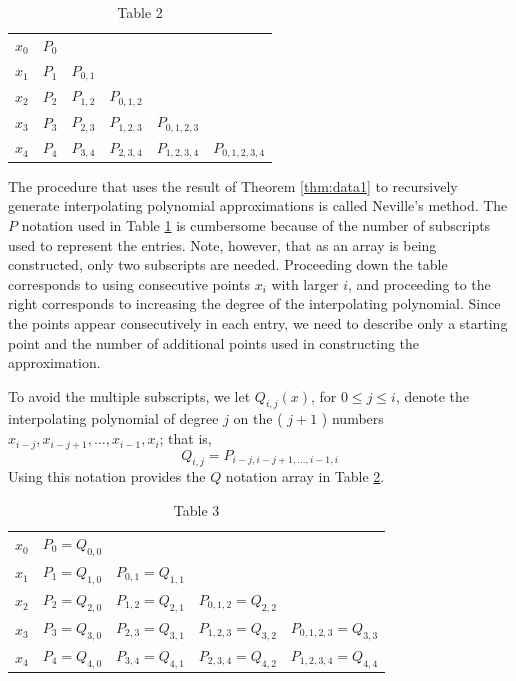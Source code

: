 \begin{table}
\centering
\begin{tabular}{llllll}
\hline
$x_{0}$ & $P_{0}$ &  &  &  &  \\
$x_{1}$ & $P_{1}$ & $P_{0,1}$ &  &  &  \\
$x_{2}$ & $P_{2}$ & $P_{1,2}$ & $P_{0,1,2}$ &  &  \\
$x_{3}$ & $P_{3}$ & $P_{2,3}$ & $P_{1,2,3}$ & $P_{0,1,2,3}$ &  \\
$x_{4}$ & $P_{4}$ & $P_{3,4}$ & $P_{2,3,4}$ & $P_{1,2,3,4}$ & $P_{0,1,2,3,4}$ \\
\hline
\end{tabular}
\caption{\scriptsize Table 2}
\label{tab:dataexplain1}
\end{table}
%
%
%

%

The procedure that uses the result of Theorem \ref{thm:data1} to recursively generate interpolating polynomial approximations is called Neville's method. The $P$ notation used in Table \ref{tab:dataexplain1} is cumbersome because of the number of subscripts used to represent the entries. Note, however, that as an array is being constructed, only two subscripts are needed. Proceeding down the table corresponds to using consecutive points $x_{i}$ with larger $i$, and proceeding to the right corresponds to increasing the degree of the interpolating polynomial. Since the points appear consecutively in each entry, we need to describe only a starting point and the number of additional points used in constructing the approximation.

To avoid the multiple subscripts, we let $Q_{i, j}(x)$, for $0 \leq j \leq i$, denote the interpolating polynomial of degree $j$ on the ( $j+1$ ) numbers $x_{i-j}, x_{i-j+1}, \ldots, x_{i-1}, x_{i}$; that is,
\[Q_{i, j}=P_{i-j, i-j+1, \ldots, i-1, i}\]
Using this notation provides the $Q$ notation array in Table \ref{tab:dataexplain2}.

\begin{table}
\centering
\begin{tabular}{lllll}
\hline
$x_{0}$ & $P_{0}=Q_{0,0}$ &  &  &  \\
$x_{1}$ & $P_{1}=Q_{1,0}$ & $P_{0,1}=Q_{1,1}$ &  &  \\
$x_{2}$ & $P_{2}=Q_{2,0}$ & $P_{1,2}=Q_{2,1}$ & $P_{0,1,2}=Q_{2,2}$ &  \\
$x_{3}$ & $P_{3}=Q_{3,0}$ & $P_{2,3}=Q_{3,1}$ & $P_{1,2,3}=Q_{3,2}$ & $P_{0,1,2,3}=Q_{3,3}$ \\
$x_{4}$ & $P_{4}=Q_{4,0}$ & $P_{3,4}=Q_{4,1}$ & $P_{2,3,4}=Q_{4,2}$ & $P_{1,2,3,4}=Q_{4,4}$ \\
\hline
\end{tabular}
\caption{\scriptsize Table 3}
\label{tab:dataexplain2}
\end{table}

